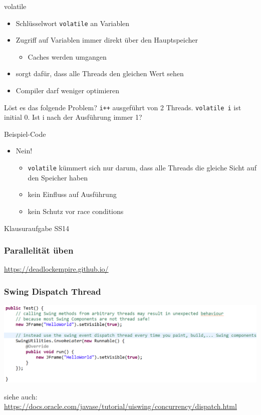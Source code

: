 \documentclass[18pt]{beamer}
\begin{document}
	\begin{frame}{volatile}
		\begin{itemize}
			\item Schlüsselwort \texttt{volatile} an Variablen
			\item Zugriff auf Variablen immer direkt über den Hauptspeicher
			\begin{itemize}
				\item Caches werden umgangen
			\end{itemize}
			\item sorgt dafür, dass alle Threads den gleichen Wert sehen \pause
			\item Compiler darf weniger optimieren
		\end{itemize} \pause
		\begin{exampleblock}{Löst es das folgende Problem?}
			\texttt{i++} ausgeführt von 2 Threads. \texttt{volatile i} ist initial 0. \linebreak Ist i nach der Ausführung immer 1?
		\end{exampleblock} \pause Beispiel-Code \pause
		\begin{itemize}
			\item Nein! 
			\begin{itemize}
				\item \texttt{volatile} kümmert sich nur darum, dass alle Threads die gleiche Sicht auf den Speicher haben
				\item kein Einfluss auf Ausführung
				\item kein Schutz vor race conditions
			\end{itemize}
		\end{itemize}
	\end{frame}
	
	\begin{frame}
		\centering
		\begin{huge}
			Klausuraufgabe SS14
		\end{huge}
	\end{frame}
	
	\begin{frame}
		\frametitle{Parallelität üben}
		\centering \huge \url{https://deadlockempire.github.io/}
	\end{frame}
	
	
	\begin{frame}
		\frametitle{Swing Dispatch Thread}
		\includegraphics[scale=0.35]{./pics/tut5/edt.png}
		\begin{tiny}
			siehe auch: \url{https://docs.oracle.com/javase/tutorial/uiswing/concurrency/dispatch.html}
		\end{tiny}
	\end{frame}
\end{document}

